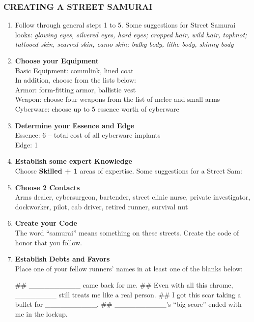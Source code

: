 \subsubsection{CREATING A STREET SAMURAI}
\begin{enumerate}
    \item Follow through general steps 1 to 5. Some suggestions for Street Samurai looks: \textit{glowing eyes, silvered eyes, hard eyes; cropped hair, wild hair, topknot; tattooed skin, scarred skin, camo skin; bulky body, lithe body, skinny body}
    
    \item \textbf{Choose your Equipment} \\
    Basic Equipment: commlink, lined coat \\
    In addition, choose from the lists below: \\
    Armor: form-fitting armor, ballistic vest \\
    Weapon: choose four weapons from the list of melee and small arms \\
    Cyberware: choose up to 5 essence worth of cyberware
    
    \item \textbf{Determine your Essence and Edge} \\
    Essence: 6 – total cost of all cyberware implants \\
    Edge: 1

    \item \textbf{Establish some expert Knowledge} \\
    Choose \textbf{\textsf{Skilled + 1}} areas of expertise. Some suggestions for a Street Sam: \textit{}
    
    \item \textbf{Choose 2 Contacts} \\
    Arms dealer, cybersurgeon, bartender, street clinic nurse, private investigator, dockworker, pilot, cab driver, retired runner, survival nut
    
    \item \textbf{Create your Code} \\
    The word “samurai” means something on these streets. Create the code of honor that you follow.
    
    \item \textbf{Establish Debts and Favors} \\
    Place one of your fellow runners’ names in at least one of the blanks below:
        \begin{easylist}
            ## \_\_\_\_\_\_\_\_\_\_ came back for me.
            ## Even with all this chrome, \_\_\_\_\_\_\_\_ still treats me like a real person.
            ## I got this scar taking a bullet for \_\_\_\_\_\_\_\_\_\_.
            ## \_\_\_\_\_\_\_\_\_\_’s “big score” ended with me in the lockup.
        \end{easylist}            
    

\end{enumerate}
